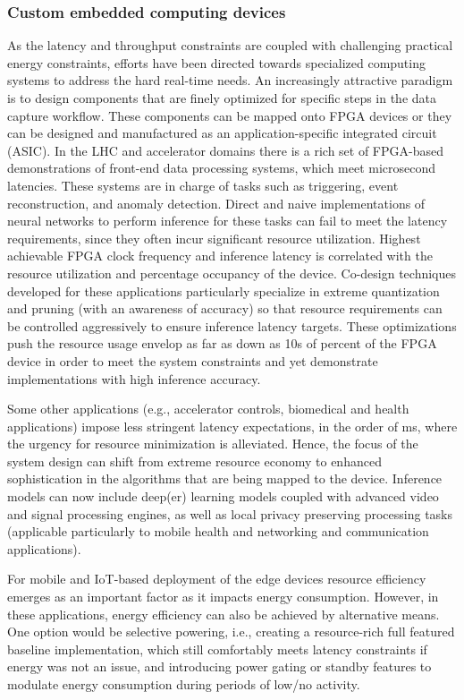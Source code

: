\subsubsection{Custom embedded computing devices}
As the latency and throughput constraints are coupled with challenging practical energy constraints, efforts have been directed towards specialized computing systems to address the hard real-time needs. 
An increasingly attractive paradigm is to design components that are finely optimized for specific steps in the data capture workflow. 
These components can be mapped onto FPGA devices or they can be designed and manufactured as an application-specific integrated circuit (ASIC). 
In the LHC and accelerator domains there is a rich set of FPGA-based demonstrations of front-end data processing systems, which meet microsecond latencies. 
These systems are in charge of tasks such as triggering, event reconstruction, and anomaly detection. Direct and naive implementations of neural networks to perform inference for these tasks can fail to meet the latency requirements, since they often incur significant resource utilization. 
Highest achievable FPGA clock frequency and inference latency is correlated with the resource utilization and percentage occupancy of the device. 
Co-design techniques developed for these applications particularly specialize in extreme quantization and pruning (with an awareness of accuracy) so that resource requirements can be controlled aggressively to ensure inference latency targets. 
These optimizations push the resource usage envelop as far as down as 10s of percent of the FPGA device in order to meet the system constraints and yet demonstrate implementations with high inference accuracy.

Some other applications (e.g., accelerator controls, biomedical and health applications) impose less stringent latency expectations, in the order of ms, where the urgency for resource minimization is alleviated. 
Hence, the focus of the system design can shift from extreme resource economy to enhanced sophistication in the algorithms that are being mapped to the device. 
Inference models can now include deep(er) learning models coupled with advanced video and signal processing engines, as well as local privacy preserving processing tasks (applicable particularly to mobile health and networking and communication applications). 

For mobile and IoT-based deployment of the edge devices resource efficiency emerges as an important factor as it impacts energy consumption.
However, in these applications, energy efficiency can also be achieved by alternative means. 
One option would be selective powering, i.e., creating a resource-rich full featured baseline implementation, which still comfortably meets latency constraints if energy was not an issue, and introducing power gating or standby features to modulate energy consumption during periods of low/no activity. 

